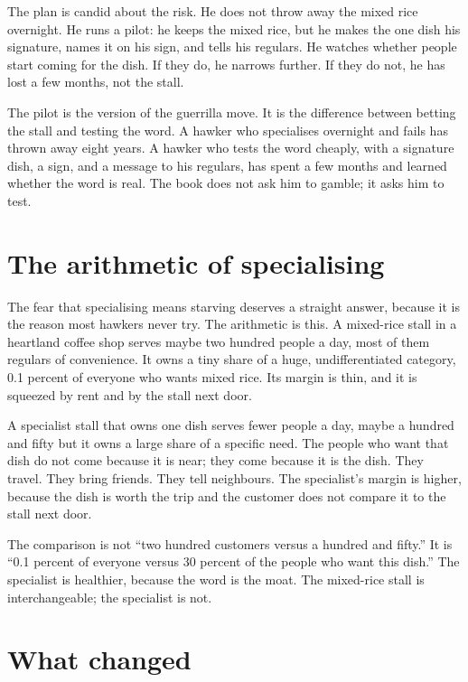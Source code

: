 \documentclass[10pt,twoside,openany]{memoir}
\newcommand{\needspacehead}{\needspace{4\baselineskip}}
\let\oldsection\section
\renewcommand{\section}{\needspacehead\oldsection}
\begin{document}
{The plan is candid about the risk. He does not throw away the mixed rice
overnight. He runs a pilot: he keeps the mixed rice, but he makes the
one dish his signature, names it on his sign, and tells his regulars. He
watches whether people start coming for the dish. If they do, he narrows
further. If they do not, he has lost a few months, not the stall.

The pilot is the version of the guerrilla move. It is the difference
between betting the stall and testing the word. A hawker who specialises
overnight and fails has thrown away eight years. A hawker who tests the
word cheaply, with a signature dish, a sign, and a message to his
regulars, has spent a few months and learned whether the word is real.
The book does not ask him to gamble; it asks him to test.

\section{The arithmetic of
specialising}\label{the-arithmetic-of-specialising}

The fear that specialising means starving deserves a straight answer,
because it is the reason most hawkers never try. The arithmetic is this.
A mixed-rice stall in a heartland coffee shop serves maybe two hundred
people a day, most of them regulars of convenience. It owns a tiny share
of a huge, undifferentiated category, 0.1 percent of everyone who wants
mixed rice. Its margin is thin, and it is squeezed by rent and by the
stall next door.

A specialist stall that owns one dish serves fewer people a day, maybe a
hundred and fifty but it owns a large share of a specific need. The
people who want that dish do not come because it is near; they come
because it is the dish. They travel. They bring friends. They tell
neighbours. The specialist's margin is higher, because the dish is worth
the trip and the customer does not compare it to the stall next door.

The comparison is not ``two hundred customers versus a hundred and
fifty.'' It is ``0.1 percent of everyone versus 30 percent of the people
who want this dish.'' The specialist is healthier, because the word is
the moat. The mixed-rice stall is interchangeable; the specialist is
not.

\section{What changed}\label{what-changed-1}

}
\end{document}
